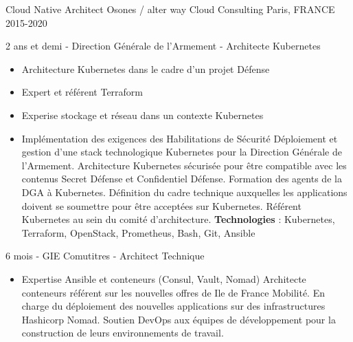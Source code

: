 \begin{cventries}
{\begin{cvitems}
      \end{cvitems}
    }
  \cventry
    {Cloud Native Architect} %
    {Osones / alter way Cloud Consulting} %
    {Paris, FRANCE} %
    {2015-2020} %
    {
      \begin{cvitems} %
      \item {2 ans et demi - Direction Générale de l'Armement - Architecte Kubernetes}
        \begin{itemize}
          \item {Architecture Kubernetes dans le cadre d'un projet Défense}
          \item {Expert et référent Terraform}
          \item {Experise stockage et réseau dans un contexte Kubernetes}
          \item {Implémentation des exigences des Habilitations de Sécurité}
            \newline{}
            {
            Déploiement et gestion d’une stack technologique Kubernetes pour la
            Direction Générale de l’Armement. Architecture Kubernetes sécurisée
            pour être compatible avec les contenus Secret Défense et
            Confidentiel Défense. Formation des agents de la DGA à Kubernetes.
            Définition du cadre technique auxquelles les applications doivent
            se soumettre pour être acceptées sur Kubernetes.
            Référent Kubernetes au sein du comité d’architecture. \newline{}
              \textbf{Technologies} : Kubernetes, Terraform, OpenStack,
              Prometheus, Bash, Git, Ansible
            }
        \end{itemize}
      \item {6 mois - GIE Comutitres - Architect Technique}
        \begin{itemize}
          \item {Expertise Ansible et conteneurs (Consul, Vault, Nomad)}
            \newline{}
            {
              Architecte conteneurs référent sur les nouvelles offres de Ile de
              France Mobilité. En charge du déploiement des nouvelles
              applications sur des infrastructures Hashicorp Nomad. Soutien
              DevOps aux équipes de développement pour la construction de leurs
              environnements de travail. \newline{}
}
\end{itemize}
\end{cvitems}}
\end{cventries}
